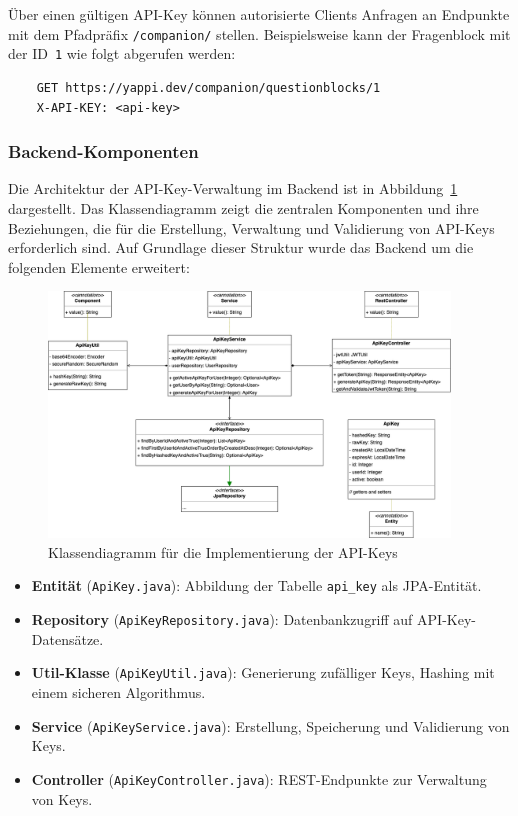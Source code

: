 \documentclass[12pt,a4paper]{report}
\begin{document}
Über einen gültigen API-Key können autorisierte Clients Anfragen an Endpunkte mit dem Pfadpräfix \texttt{/companion/} stellen.
Beispielsweise kann der Fragenblock mit der ID~\texttt{1} wie folgt abgerufen werden:

\begin{verbatim}
    GET https://yappi.dev/companion/questionblocks/1
    X-API-KEY: <api-key>
\end{verbatim}

\subsubsection{Backend-Komponenten}

Die Architektur der API-Key-Verwaltung im Backend ist in Abbildung~\ref{fig:apikey-class} dargestellt.  
Das Klassendiagramm zeigt die zentralen Komponenten und ihre Beziehungen, die für die Erstellung, Verwaltung und Validierung von API-Keys erforderlich sind.  
Auf Grundlage dieser Struktur wurde das Backend um die folgenden Elemente erweitert:

\begin{figure}[H]
  \centering
  \includegraphics[width=0.95\textwidth]{../figures/apikey-class-diagram.drawio.png}
  \caption{Klassendiagramm für die Implementierung der API-Keys}
  \label{fig:apikey-class}
\end{figure}

\begin{itemize}
  \item \textbf{Entität} (\texttt{ApiKey.java}):  Abbildung der Tabelle \texttt{api\_key} als JPA-Entität.
  \item \textbf{Repository} (\texttt{ApiKeyRepository.java}): Datenbankzugriff auf API-Key-Datensätze.
  \item \textbf{Util-Klasse} (\texttt{ApiKeyUtil.java}): Generierung zufälliger Keys, Hashing mit einem sicheren Algorithmus.
  \item \textbf{Service} (\texttt{ApiKeyService.java}): Erstellung, Speicherung und Validierung von Keys.
  \item \textbf{Controller} (\texttt{ApiKeyController.java}): REST-Endpunkte zur Verwaltung von Keys.
\end{itemize}
\end{document}
